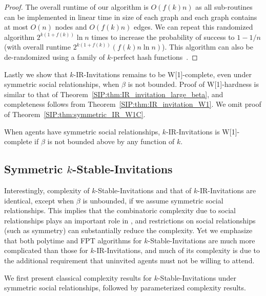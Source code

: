 \begin{proof}
	The overall runtime of our algorithm is $O(f(k) n)$ as all sub-routines can be implemented in linear time in size of each graph and each graph contains at most $O(n)$ nodes and $O(f(k)n)$ edges.
	We can repeat this randomized algorithm $2^{k(1+f(k))}\ln n$ times to increase the probability of success to $1-1/n$ (with overall runtime $2^{k(1+f(k))}(f(k) n \ln n)$).
	This algorithm can also be de-randomized using a family of $k$-perfect hash functions~\cite{ColorCoding}. 
\end{proof}

Lastly we show that $k$-IR-Invitations remains to be W[1]-complete, even under symmetric social relationships, when $\beta$ is not bounded. Proof of W[1]-hardness is similar to that of Theorem~\ref{SIP:thm:IR_invitation_large_beta}, and completeness follows from Theorem~\ref{SIP:thm:IR_invitation_W1}. We omit proof of Theorem~\ref{SIP:thm:symmetric_IR_W1C}.
\begin{theorem} \label{SIP:thm:symmetric_IR_W1C}
	When agents have symmetric social relationships, 
	$k$-IR-Invitations is W[1]-complete if $\beta$ is not bounded above by any function of $k$. 
\end{theorem}



\subsection{Symmetric $k$-Stable-Invitations}
Interestingly, complexity of $k$-Stable-Invitations and that of $k$-IR-Invitations are identical, except when $\beta$ is unbounded, if we assume symmetric social relationships.
This implies that the combinatoric complexity due to social relationships plays an important role in \SIP, and restrictions on social relationships (such as symmetry) can substantially reduce the complexity. 
Yet we emphasize that both polytime and FPT algorithms for $k$-Stable-Invitations are much more complicated than those for $k$-IR-Invitations, and much of its complexity is due to the additional requirement that uninvited agents must not be willing to attend.

We first present classical complexity results for $k$-Stable-Invitations under symmetric social relationships, followed by parameterized complexity results. 


